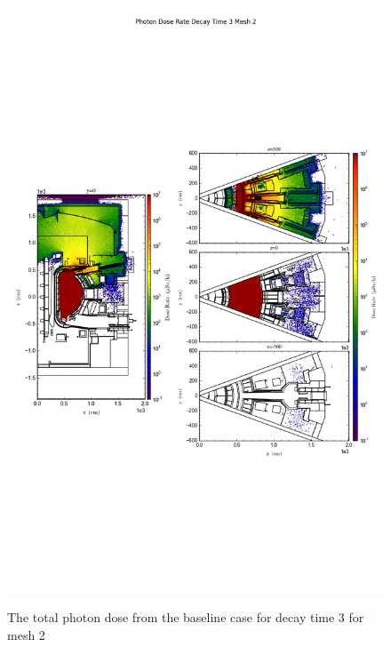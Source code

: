 \begin{figure}[ht!]
\centering
\includegraphics[trim={0cm 9cm 0cm 10cm},clip,scale=0.75]{../plots/final_model/Photon_Dose_Rate_Decay_Time_3_Mesh_2.png}
\label{fig:photons_dc3_no4bc_m2_flux}
\caption{The total photon dose from the baseline case for decay time 3 for mesh 2}
\end{figure}
